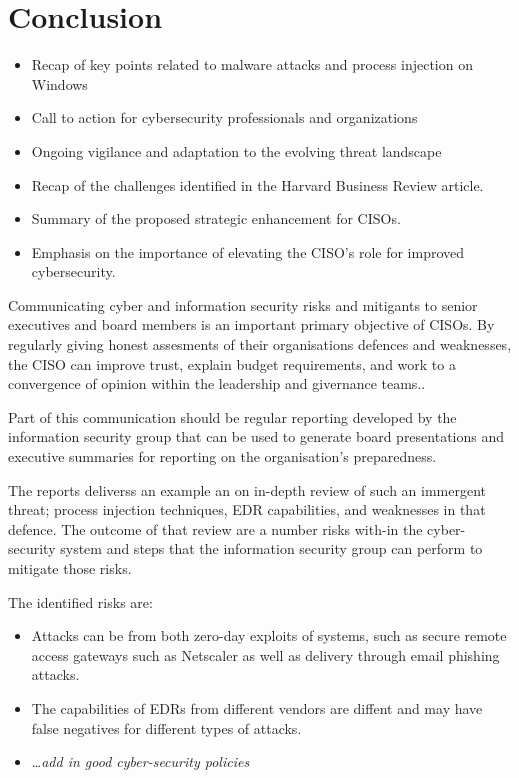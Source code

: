 \section{Conclusion}

\begin{itemize}
   \item Recap of key points related to malware attacks and process injection on Windows
   \item Call to action for cybersecurity professionals and organizations
     \item Ongoing vigilance and adaptation to the evolving threat landscape
      \item Recap of the challenges identified in the Harvard Business Review article.
      \item Summary of the proposed strategic enhancement for CISOs.
      \item Emphasis on the importance of elevating the CISO's role for improved cybersecurity.
   \end{itemize}


Communicating cyber and information security risks and mitigants to senior executives and board members is an important primary objective of CISOs.
By regularly giving honest assesments of their organisations defences and weaknesses, the CISO can improve trust, explain budget requirements, and work to a convergence of opinion within the
leadership and givernance teams..

Part of this communication should be regular reporting developed by the information security group that can be used to generate board presentations and executive summaries for reporting on the
organisation's preparedness.

The reports deliverss an example an on in-depth review of such an immergent threat; process injection techniques, EDR capabilities, and weaknesses in that defence.  The outcome of that review are
a number risks with-in the cyber-security system and  steps that the information security group can perform to mitigate those risks.

The identified risks are:
\begin{itemize}
\item Attacks can be from both zero-day exploits of systems, such as secure remote access gateways such as Netscaler as well as delivery through email phishing attacks.
\item The capabilities of EDRs from different vendors are diffent and may have false negatives for different types of attacks.
\item \ldots \textit{add in good cyber-security policies}
\end{itemize}

